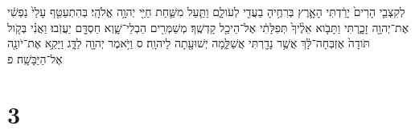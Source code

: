 \documentclass{openreader}
\begin{document}
לְקִצְבֵ֤י הָרִים֙ יָרַ֔דְתִּי הָאָ֛רֶץ בְּרִחֶ֥יהָ בַעֲדִ֖י לְעֹולָ֑ם וַתַּ֧עַל מִשַּׁ֛חַת חַיַּ֖י יְהוָ֥ה אֱלֹהָֽי׃ בְּהִתְעַטֵּ֤ף עָלַי֙ נַפְשִׁ֔י אֶת־יְהוָ֖ה זָכָ֑רְתִּי וַתָּבֹ֤וא אֵלֶ֨יךָ֙ תְּפִלָּתִ֔י אֶל־הֵיכַ֖ל קָדְשֶֽׁךָ׃ מְשַׁמְּרִ֖ים הַבְלֵי־שָׁ֑וְא חַסְדָּ֖ם יַעֲזֹֽבוּ׃ וַאֲנִ֗י בְּקֹ֤ול תֹּודָה֙ אֶזְבְּחָה־לָּ֔ךְ אֲשֶׁ֥ר נָדַ֖רְתִּי אֲשַׁלֵּ֑מָה יְשׁוּעָ֖תָה לַיהוָֽה׃ ס וַיֹּ֥אמֶר יְהוָ֖ה לַדָּ֑ג וַיָּקֵ֥א אֶת־יֹונָ֖ה אֶל־הַיַּבָּשָֽׁה׃ פ \section*{3}
\end{document}
